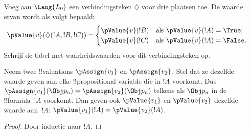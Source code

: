 \documentclass[../../../include/open-logic-section]{subfiles}
\begin{document}
\begin{prob}
Voeg aan $\Lang{L_0}$ een verbindingsteken $\diamondsuit$ voor drie
plaatsen toe. De waarde ervan wordt als volgt bepaald:
\begin{gather*}
  \pValue{v}(\diamondsuit( !A , !B , !C ) ) = \begin{cases}
    \pValue{v}( !B ) &
    \text{als $\pValue{v}(!A) = \True$;}\\
    \pValue{v}( !C ) &
    \text{als $\pValue{v}(!A) = \False $}.
  \end{cases}
\end{gather*}
Schrijf de tabel met waarheidswaarden voor dit verbindingsteken op.
\end{prob}

\begin{thm}
 Neem twee !!{valuation}s
$\pAssign{v_1}$ en $\pAssign{v_2}$. Stel dat ze dezelfde waarde geven
aan elke !!{propositional variable} die in $!A$ voorkomt. Dus
$\pAssign{v_1}(\Obj p_n) = \pAssign{v_2}(\Obj p_n)$ telkens als
$\Obj p_n$ in de !!{formula}~$!A$ voorkomt. Dan geven ook
$\pValue{v_1}$ en $\pValue{v_2}$ dezelfde waarde aan~$!A$:
$\pValue{v_1}(!A) = \pValue{v_2}(!A)$.
\end{thm}

\begin{proof}
Door inductie naar $!A$.
\end{proof}
\end{document}
